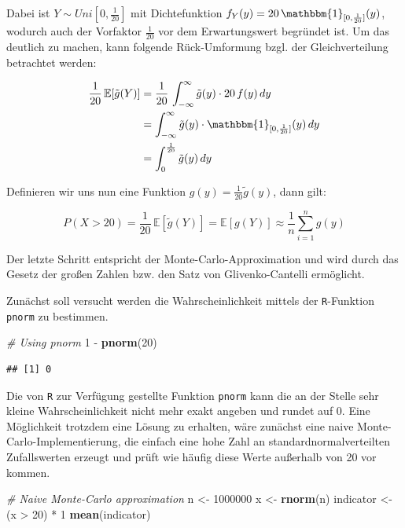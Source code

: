 \documentclass[10pt,]{article}
\newenvironment{Shaded}{\begin{snugshade}}{\end{snugshade}}
\newcommand{\KeywordTok}[1]{\textcolor[rgb]{0.13,0.29,0.53}{\textbf{{#1}}}}
\newcommand{\DecValTok}[1]{\textcolor[rgb]{0.00,0.00,0.81}{{#1}}}
\newcommand{\StringTok}[1]{\textcolor[rgb]{0.31,0.60,0.02}{{#1}}}
\newcommand{\CommentTok}[1]{\textcolor[rgb]{0.56,0.35,0.01}{\textit{{#1}}}}
\newcommand{\NormalTok}[1]{{#1}}
\begin{document}
Dabei ist \(Y \sim Uni[0,\frac{1}{20}]\) mit Dichtefunktion
\(f_Y(y) = 20\,\mathbbm{1}_{[0,\frac{1}{20}]}(y)\), wodurch auch der
Vorfaktor \(\frac{1}{20}\) vor dem Erwartungswert begründet ist. Um das
deutlich zu machen, kann folgende Rück-Umformung bzgl. der
Gleichverteilung betrachtet werden:

\begin{align*}
\frac{1}{20}\,\mathbb{E}[\tilde{g}(Y)] &= \frac{1}{20}\,\int_{-\infty}^{\infty} \tilde{g}(y)\cdot 20\,f(y) \,dy\\
&= \int_{-\infty}^{\infty} \tilde{g}(y)\cdot \mathbbm{1}_{[0,\frac{1}{20}]}(y) \,dy\\
&= \int_{0}^{\frac{1}{20}} \tilde{g}(y) \,dy
\end{align*}

Definieren wir uns nun eine Funktion
\(g(y) = \frac{1}{20} \tilde{g}(y)\), dann gilt:

\begin{equation*}
P(X > 20) = \frac{1}{20}\,\mathbb{E}[\tilde{g}(Y)] = \mathbb{E}[g(Y)] \approx \frac{1}{n}\sum_{i=1}^n g(y)
\end{equation*}

Der letzte Schritt entspricht der Monte-Carlo-Approximation und wird
durch das Gesetz der großen Zahlen bzw. den Satz von Glivenko-Cantelli
ermöglicht.

Zunächst soll versucht werden die Wahrscheinlichkeit mittels der
\texttt{R}-Funktion \texttt{pnorm} zu bestimmen.

\begin{Shaded}
\begin{Highlighting}[]
\CommentTok{# Using pnorm}
\DecValTok{1} \NormalTok{-}\StringTok{ }\KeywordTok{pnorm}\NormalTok{(}\DecValTok{20}\NormalTok{)}
\end{Highlighting}
\end{Shaded}

\begin{verbatim}
## [1] 0
\end{verbatim}

Die von \texttt{R} zur Verfügung gestellte Funktion \texttt{pnorm} kann
die an der Stelle sehr kleine Wahrscheinlichkeit nicht mehr exakt
angeben und rundet auf 0. Eine Möglichkeit trotzdem eine Lösung zu
erhalten, wäre zunächst eine naive Monte-Carlo-Implementierung, die
einfach eine hohe Zahl an standardnormalverteilten Zufallswerten erzeugt
und prüft wie häufig diese Werte außerhalb von 20 vor kommen.

\begin{Shaded}
\begin{Highlighting}[]
\CommentTok{# Naive Monte-Carlo approximation}
\NormalTok{n <-}\StringTok{ }\DecValTok{1000000}
\NormalTok{x <-}\StringTok{ }\KeywordTok{rnorm}\NormalTok{(n)}
\NormalTok{indicator <-}\StringTok{ }\NormalTok{(x >}\StringTok{ }\DecValTok{20}\NormalTok{) *}\StringTok{ }\DecValTok{1}
\KeywordTok{mean}\NormalTok{(indicator)}
\end{Highlighting}
\end{Shaded}
\end{document}
